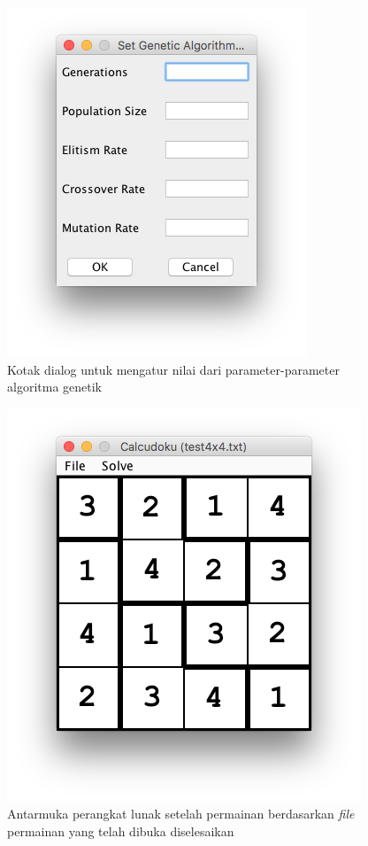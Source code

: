\begin{enumerate}
\begin{figure}
\centering
\captionsetup{justification=centering}
\includegraphics[scale=0.5]{Gambar/ImplementasiPengujian/SetGAParameters.png}
\caption[Kotak dialog untuk mengatur nilai dari parameter-parameter algoritma genetik]{Kotak dialog untuk mengatur nilai dari parameter-parameter algoritma genetik}
\label{fig:antarmukapl4}
\end{figure}

\begin{figure}
\centering
\captionsetup{justification=centering}
\includegraphics[scale=0.5]{Gambar/ImplementasiPengujian/Calcudoku3.png}
\caption[Antarmuka perangkat lunak setelah permainan berdasarkan \textit{file} permainan yang telah dibuka diselesaikan]{Antarmuka perangkat lunak setelah permainan berdasarkan \textit{file} permainan yang telah dibuka diselesaikan}
\label{fig:antarmukapl5}
\end{figure}

\end{enumerate}

